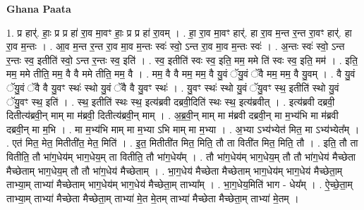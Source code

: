 \documentclass[17pt]{extarticle}
\begin{document}
\textbf{Ghana Paata } \newline

1. प्र हार्॑. हाः॒ प्र प्र हा॑ रा॒व मा॒वꣳ हाः॒ प्र प्र हा॑ रा॒वम् । . हा॒ रा॒व मा॒वꣳ हार्॑. हा रा॒व म॒न्त र॒न्त रा॒वꣳ हार्॑. हा रा॒व म॒न्तः । . आ॒व म॒न्त र॒न्त रा॒व मा॒व म॒न्तः स्वः॑ स्वो॒ ऽन्त रा॒व मा॒व म॒न्तः स्वः॑ । . अ॒न्तः स्वः॑ स्वो॒ ऽन्त र॒न्तः स्व॒ इतीति॑ स्वो॒ ऽन्त र॒न्तः स्व॒ इति॑ । . स्व॒ इतीति॑ स्वः स्व॒ इति॒ मम॒ ममे ति॑ स्वः स्व॒ इति॒ मम॑ । . इति॒ मम॒ ममे तीति॒ मम॒ वै वै ममे तीति॒ मम॒ वै । . मम॒ वै वै मम॒ मम॒ वै यु॒वं ॅयु॒वं ॅवै मम॒ मम॒ वै यु॒वम् । . वै यु॒वं ॅयु॒वं ॅवै वै यु॒वꣳ स्थः॑ स्थो यु॒वं ॅवै वै यु॒वꣳ स्थः॑ । . यु॒वꣳ स्थः॑ स्थो यु॒वं ॅयु॒वꣳ स्थ॒ इतीति॑ स्थो यु॒वं ॅयु॒वꣳ स्थ॒ इति॑ । . स्थ॒ इतीति॑ स्थः स्थ॒ इत्य॑ब्रवी दब्रवी॒दिति॑ स्थः स्थ॒ इत्य॑ब्रवीत् । . इत्य॑ब्रवी दब्रवी॒ दितीत्य॑ब्रवी॒न् माम् मा म॑ब्रवी॒ दितीत्य॑ब्रवी॒न् माम् । . अ॒ब्र॒वी॒न् माम् मा म॑ब्रवी दब्रवी॒न् मा म॒भ्य॑भि मा म॑ब्रवी दब्रवी॒न् मा म॒भि । . मा म॒भ्य॑भि माम् मा म॒भ्या ऽभि माम् मा म॒भ्या । . अ॒भ्या ऽभ्य॑भ्येत॑ मित॒ मा ऽभ्य॑भ्येत᳚म् । . एत॑ मित॒ मेत॒ मितीती॑त॒ मेत॒ मिति॑ । . इ॒त॒ मितीती॑त मित॒ मिति॒ तौ ता विती॑त मित॒ मिति॒ तौ । . इति॒ तौ ता वितीति॒ तौ भा॑ग॒धेय॑म् भाग॒धेय॒म् ता वितीति॒ तौ भा॑ग॒धेय᳚म् । . तौ भा॑ग॒धेय॑म् भाग॒धेय॒म् तौ तौ भा॑ग॒धेय॑ मैच्छेता मैच्छेताम् भाग॒धेय॒म् तौ तौ भा॑ग॒धेय॑ मैच्छेताम् । . भा॒ग॒धेय॑ मैच्छेता मैच्छेताम् भाग॒धेय॑म् भाग॒धेय॑ मैच्छेता॒म् ताभ्या॒म् ताभ्या॑ मैच्छेताम् भाग॒धेय॑म् भाग॒धेय॑ मैच्छेता॒म् ताभ्या᳚म् । . भा॒ग॒धेय॒मिति॑ भाग - धेय᳚म् । . ऐ॒च्छे॒ता॒म् ताभ्या॒म् ताभ्या॑ मैच्छेता मैच्छेता॒म् ताभ्या॑ मे॒त मे॒तम् ताभ्या॑ मैच्छेता मैच्छेता॒म् ताभ्या॑ मे॒तम् । \newline
\end{document}
